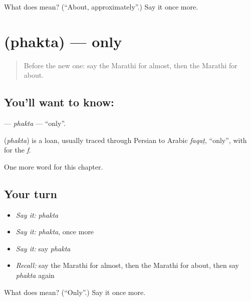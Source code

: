 \begin{tcolorbox}[breakable,colback=teal!4,colframe=teal!35!black,title={Before you move on}]
What does  mean? (\textquotedblleft{}About, approximately\textquotedblright{}.) Say it once more.
\end{tcolorbox}
\section[\texorpdfstring{\mr{फक्त} (phakta)}{फक्त (phakta)}]{ (phakta) — only}

\label{lesson:MR-C203-phakta}



\begin{quote}
Before the new one: say the Marathi for almost, then the Marathi for about.
\end{quote}

\subsection*{You'll want to know: }
\textbf{} — \emph{phakta} — \textquotedblleft{}only\textquotedblright{}.

\begin{cousinweb}
\textbf{} (\emph{phakta}) is a loan, usually traced through Persian to Arabic \emph{faqaṭ}, \textquotedblleft{}only\textquotedblright{}, with \textbf{} for the \emph{f}.
\end{cousinweb}

\begin{grammarlens}[title={What you've built}]
One more word for this chapter.
\end{grammarlens}

\subsection*{Your turn}
\begin{itemize}
\raggedright
  \item \emph{Say it:} \emph{phakta}
  \item \emph{Say it:} \emph{phakta}, once more
  \item \emph{Say it:} say \emph{phakta}
  \item \emph{Recall:} say the Marathi for almost, then the Marathi for about, then say \emph{phakta} again
\end{itemize}

\begin{tcolorbox}[breakable,colback=teal!4,colframe=teal!35!black,title={Before you move on}]
What does  mean? (\textquotedblleft{}Only\textquotedblright{}.) Say it once more.
\end{tcolorbox}
